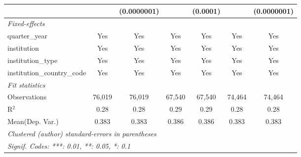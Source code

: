 \begin{tabular}{lcccccc}
                                      &               & (0.0000001)   &               & (0.0001)      &               & (0.0000001)\\   
   \midrule
   \emph{Fixed-effects}\\
   quarter\_year                      & Yes           & Yes           & Yes           & Yes           & Yes           & Yes\\  
   institution                        & Yes           & Yes           & Yes           & Yes           & Yes           & Yes\\  
   institution\_type                  & Yes           & Yes           & Yes           & Yes           & Yes           & Yes\\  
   institution\_country\_code         & Yes           & Yes           & Yes           & Yes           & Yes           & Yes\\  
   \midrule
   \emph{Fit statistics}\\
   Observations                       & 76,019        & 76,019        & 67,540        & 67,540        & 74,464        & 74,464\\  
   R$^2$                              & 0.28          & 0.28          & 0.29          & 0.29          & 0.28          & 0.28\\  
Mean(Dep. Var.) & 0.383 & 0.383 & 0.386 & 0.386 & 0.383 & 0.383 \\
   \midrule \midrule
   \multicolumn{7}{l}{\emph{Clustered (author) standard-errors in parentheses}}\\
   \multicolumn{7}{l}{\emph{Signif. Codes: ***: 0.01, **: 0.05, *: 0.1}}\\
\end{tabular}
\par\endgroup
